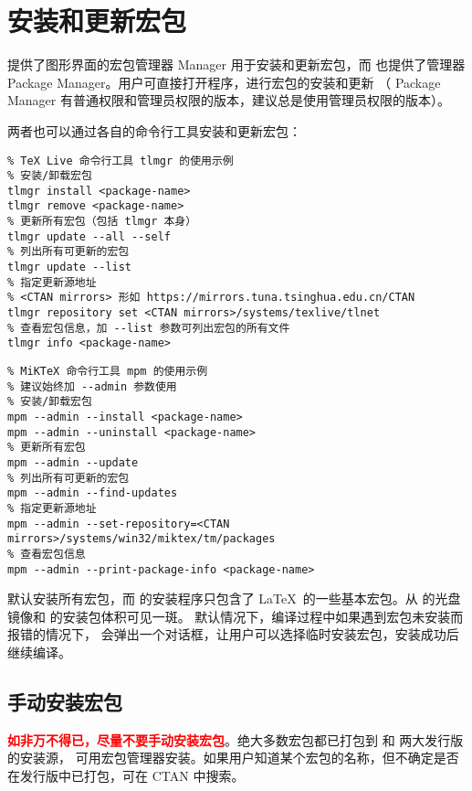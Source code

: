\section{安装和更新宏包}\label{sec:pkg-manager}

 提供了图形界面的宏包管理器  Manager 用于安装和更新宏包，而  也提供了管理器
 Package Manager。用户可直接打开程序，进行宏包的安装和更新
（ Package Manager 有普通权限和管理员权限的版本，建议总是使用管理员权限的版本）。

两者也可以通过各自的命令行工具安装和更新宏包：
\begin{verbatim}
% TeX Live 命令行工具 tlmgr 的使用示例
% 安装/卸载宏包
tlmgr install <package-name>
tlmgr remove <package-name>
% 更新所有宏包（包括 tlmgr 本身）
tlmgr update --all --self
% 列出所有可更新的宏包
tlmgr update --list
% 指定更新源地址
% <CTAN mirrors> 形如 https://mirrors.tuna.tsinghua.edu.cn/CTAN
tlmgr repository set <CTAN mirrors>/systems/texlive/tlnet
% 查看宏包信息，加 --list 参数可列出宏包的所有文件
tlmgr info <package-name>
\end{verbatim}

\begin{verbatim}
% MiKTeX 命令行工具 mpm 的使用示例
% 建议始终加 --admin 参数使用
% 安装/卸载宏包
mpm --admin --install <package-name>
mpm --admin --uninstall <package-name>
% 更新所有宏包
mpm --admin --update
% 列出所有可更新的宏包
mpm --admin --find-updates
% 指定更新源地址
mpm --admin --set-repository=<CTAN mirrors>/systems/win32/miktex/tm/packages
% 查看宏包信息
mpm --admin --print-package-info <package-name>
\end{verbatim}

 默认安装所有宏包，而  的安装程序只包含了 \LaTeX\ 的一些基本宏包。从  的光盘镜像和  的安装包体积可见一斑。
默认情况下，编译过程中如果遇到宏包未安装而报错的情况下， 会弹出一个对话框，让用户可以选择临时安装宏包，安装成功后继续编译。

\subsection{手动安装宏包}\label{subsec:pkg-manual-install}

\textbf{\textcolor{red}{如非万不得已，尽量不要手动安装宏包}}。绝大多数宏包都已打包到  和  两大发行版的安装源，
可用宏包管理器安装。如果用户知道某个宏包的名称，但不确定是否在发行版中已打包，可在 CTAN 中搜索。

